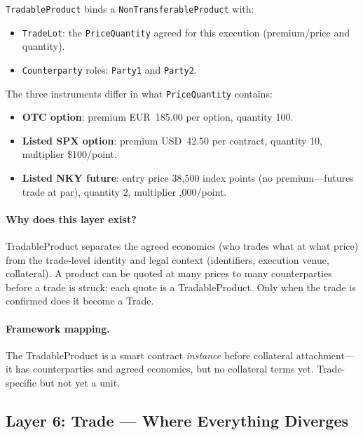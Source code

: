\documentclass[11pt,a4paper]{article}
\begin{document}
\texttt{TradableProduct} binds a \texttt{NonTransferableProduct} with:
\begin{itemize}[nosep]
\item \texttt{TradeLot}: the \texttt{PriceQuantity} agreed for this execution (premium/price and quantity).
\item \texttt{Counterparty} roles: \texttt{Party1} and \texttt{Party2}.
\end{itemize}

\noindent The three instruments differ in what \texttt{PriceQuantity} contains:
\begin{itemize}[nosep]
\item \textbf{OTC option}: premium EUR~185.00 per option, quantity 100.
\item \textbf{Listed SPX option}: premium USD~42.50 per contract, quantity 10, multiplier \$100/point.
\item \textbf{Listed NKY future}: entry price 38,500 index points (no premium---futures trade at par), quantity 2, multiplier ,000/point.
\end{itemize}

\paragraph{Why does this layer exist?} TradableProduct separates the agreed economics (who trades what at what price) from the trade-level identity and legal context (identifiers, execution venue, collateral). A product can be quoted at many prices to many counterparties before a trade is struck; each quote is a TradableProduct. Only when the trade is confirmed does it become a Trade.

\paragraph{Framework mapping.} The TradableProduct is a smart contract \textit{instance} before collateral attachment---it has counterparties and agreed economics, but no collateral terms yet. Trade-specific but not yet a unit.

\subsection{Layer 6: Trade --- Where Everything Diverges}
\label{sec:cdm-trade}
\end{document}
